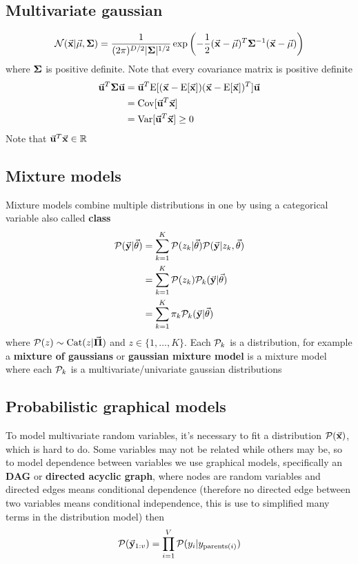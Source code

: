 \documentclass[../main.tex]{subfiles}
\begin{document}
\subsection{Multivariate gaussian}
\begin{equation*}
    \normal(\vec{x}|\vec{\mu},\mat{\Sigma}) = \dfrac{1}{(2\pi)^{D/2} |\mat{\Sigma}|^{1/2}}
        \exp\left( -\frac{1}{2}(\vec{x}-\vec{\mu})^T \mat{\Sigma}^{-1} (\vec{x}-\vec{\mu}) \right)
\end{equation*}
where $\mathbf{\Sigma}$ is positive definite. Note that every covariance matrix is positive definite
\begin{align*}
    \vec{u}^T\mat{\Sigma}\vec{u}
    &= \vec{u}^T \e{ (\vec{x}-\e{\vec{x}}) (\vec{x}-\e{\vec{x}})^T } \vec{u}\\
    &= \cov{\vec{u}^T\vec{x}}\\
    &= \var{\vec{u}^T\vec{x}} \ge 0
\end{align*}
Note that $\vec{u}^T \vec{x}\in \real$

\subsection{Mixture models}
Mixture models combine multiple distributions in one by using a categorical variable also called \textbf{class}
\begin{align*}
    \p(\vec{y}|\vec{\theta}) 
    &= \sum_{k=1}^K \p(z_k|\vec{\theta}) \p(\vec{y}|z_k, \vec{\theta} )\\
    &= \sum_{k=1}^K \p(z_k) \p_k(\vec{y}|\vec{\theta} )\\
    &= \sum_{k=1}^K \pi_k \p_k(\vec{y}|\vec{\theta} )
\end{align*}
where $\p(z)\sim \mathrm{Cat}(z|\vec{\Pi})$ and $z\in\{ 1,\dots,K \}$. Each $\mathcal{P}_k$ is a distribution, for example a \textbf{mixture of gaussians} or \textbf{gaussian mixture model} is a mixture model where each $\mathcal{P}_k$ is a multivariate/univariate gaussian distributions

\subsection{Probabilistic graphical models}
To model multivariate random variables, it's necessary to fit a distribution $\p(\vec{x})$, which is hard to do. Some variables may not be related while others may be, so to model dependence between variables we use graphical models, specifically an \textbf{DAG} or \textbf{directed acyclic graph}, where nodes are random variables and directed edges means conditional dependence (therefore no directed edge between two variables means conditional independence, this is use to simplified many terms in the distribution model) then
\begin{equation*}
    \p(\vec{y}_{1:v}) = \prod_{i=1}^{V} \p(y_i|y_{\mathrm{parents}(i)})
\end{equation*}
\end{document}
